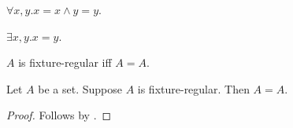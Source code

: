 \begin{axiom}\label{felix_informath_forall}
    $\forall x, y. x = x\land y = y$.
\end{axiom}

\begin{axiom}\label{felix_informath_exists}
    $\exists x, y. x = y$.
\end{axiom}

\begin{abbreviation}\label{fixture_regular}
    $A$ is fixture-regular iff $A = A$.
\end{abbreviation}

\begin{proposition}\label{felix_informath_claim}
    Let $A$ be a set.
    Suppose $A$ is fixture-regular.
    Then $A = A$.
\end{proposition}
\begin{proof}
    Follows by \auto[local].
\end{proof}

